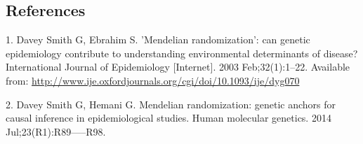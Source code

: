 \documentclass[]{article}
\begin{document}
\subsection*{References}\label{references}

\hypertarget{refs}{}
\hypertarget{ref-DaveySmith2003}{}
1. Davey Smith G, Ebrahim S. 'Mendelian randomization': can genetic
epidemiology contribute to understanding environmental determinants of
disease? International Journal of Epidemiology {[}Internet{]}. 2003
Feb;32(1):1--22. Available from:
\url{http://www.ije.oxfordjournals.org/cgi/doi/10.1093/ije/dyg070}

\hypertarget{ref-DaveySmithHemani2014}{}
2. Davey Smith G, Hemani G. Mendelian randomization: genetic anchors for
causal inference in epidemiological studies. Human molecular genetics.
2014 Jul;23(R1):R89-----R98.
\end{document}
